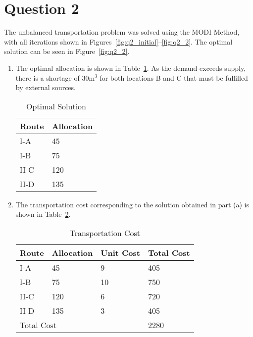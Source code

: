 \section*{Question 2}
The unbalanced transportation problem was solved using the MODI Method, with all iterations shown in Figures~\ref{fig:q2_initial}--\ref{fig:q2_2}. The optimal solution can be seen in Figure~\ref{fig:q2_2}.

\begin{enumerate}[label=(\alph*)]
\item The optimal allocation is shown in Table~\ref{tab:q2}. As the demand exceeds supply, there is a shortage of 30m$^3$ for both locations B and C that must be fulfilled by external sources.

\begin{table}[htp]
\centering
\caption{Optimal Solution}\label{tab:q2}
\begin{tabular}{|l|l|}
	\hline
	Route & Allocation \\ \hline
	I-A   & 45         \\ \hline
	I-B   & 75         \\ \hline
	II-C  & 120        \\ \hline
	II-D  & 135        \\ \hline
\end{tabular}
\end{table}

\item The transportation cost corresponding to the solution obtained in part (a) is shown in Table~\ref{tab:q2_transport}.

\begin{table}[htp]
\centering
\caption{Transportation Cost}\label{tab:q2_transport}
\begin{tabular}{|lll|l|}
	\hline
	\multicolumn{1}{|l|}{Route} & \multicolumn{1}{l|}{Allocation} & Unit Cost & Total Cost \\ \hline
	\multicolumn{1}{|l|}{I-A}   & \multicolumn{1}{l|}{45}         & 9         & 405        \\ \hline
	\multicolumn{1}{|l|}{I-B}   & \multicolumn{1}{l|}{75}         & 10        & 750        \\ \hline
	\multicolumn{1}{|l|}{II-C}  & \multicolumn{1}{l|}{120}        & 6         & 720        \\ \hline
	\multicolumn{1}{|l|}{II-D}  & \multicolumn{1}{l|}{135}        & 3         & 405        \\ \hline
	\multicolumn{3}{|l|}{Total Cost}                                          & 2280       \\ \hline
\end{tabular}
\end{table}
\end{enumerate}


